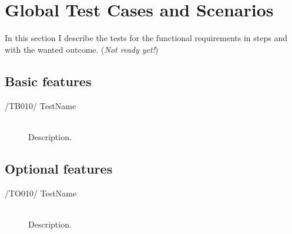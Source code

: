 \section{Global Test Cases and Scenarios}

In this section I describe the tests for the functional requirements in steps and with the wanted outcome. (\textit{Not ready yet!})

\subsection{Basic features}
\begin{description}
\item[/TB010/ TestName]\hfill \\ Description.
\end{description}

\subsection{Optional features}
\begin{description}
\item[/TO010/ TestName]\hfill \\ Description.
\end{description}